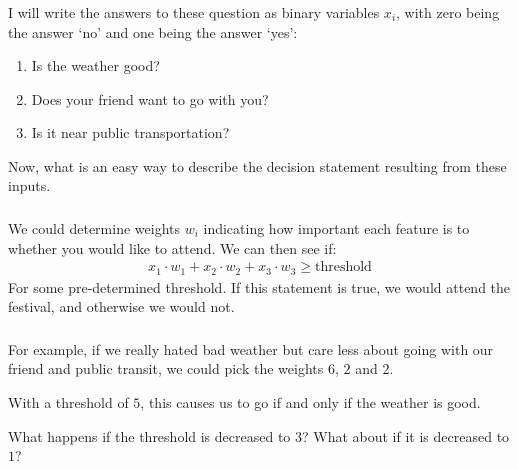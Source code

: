 \documentclass[xetex,mathserif,serif,aspectratio=169]{beamer}
\begin{document}
\begin{frame}[fragile] \frametitle{} \oldB \small


I will write the answers to these question as binary variables $x_i$, with
zero being the answer `no' and one being the answer `yes':
\begin{enumerate}
\item Is the weather good? \quad {}
\item Does your friend want to go with you?  \quad {}
\item Is it near public transportation?  \quad {}
\end{enumerate}
Now, what is an easy way to describe the decision statement resulting from
these inputs.

\end{frame}

\begin{frame}[fragile] \frametitle{} \oldB \small


We could determine weights $w_i$ indicating how important each feature is
to whether you would like to attend. We can then see if:
\begin{align*}
x_1 \cdot w_1 + x_2 \cdot w_2 + x_3 \cdot w_3 \geq \text{threshold}
\end{align*}
For some pre-determined threshold. If this statement is true, we would
attend the festival, and otherwise we would not.

\end{frame}

\begin{frame}[fragile] \frametitle{} \oldB \small


For example, if we really hated bad weather but care less about going with
our friend and public transit, we could pick the weights $6$, $2$ and $2$.

\pause With a threshold of $5$, this causes us to go if and only if the weather
is good.

\pause What happens if the threshold is decreased to $3$? What about if it is
decreased to $1$?

\end{frame}
\end{document}
